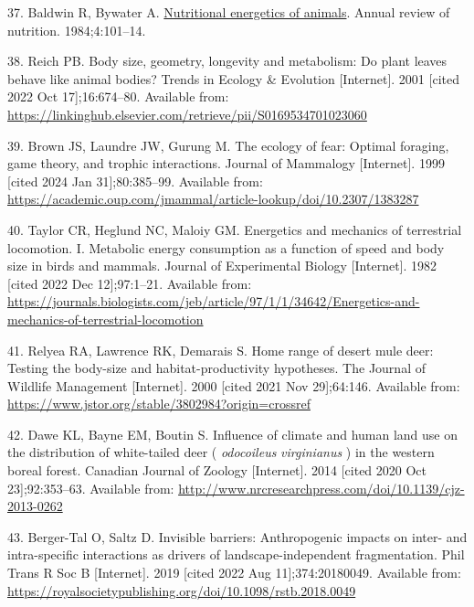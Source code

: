 \documentclass[
  12pt,
]{article}
\newlength{\cslhangindent}
\newenvironment{CSLReferences}[2] %
 {\begin{list}{}{%
  \setlength{\itemindent}{0pt}
  \setlength{\leftmargin}{0pt}
  \setlength{\parsep}{0pt}
  \ifodd #1
   \setlength{\leftmargin}{\cslhangindent}
   \setlength{\itemindent}{-1\cslhangindent}
  \fi
  \setlength{\itemsep}{#2\baselineskip}}}
 {\end{list}}
\begin{document}
\begin{CSLReferences}{0}{1}
37. Baldwin R, Bywater A. \href{https://doi.org/10.1146/annurev.nu.04.070184.000533}{Nutritional energetics of animals}. Annual review of nutrition. 1984;4:101--14.

38. Reich PB. Body size, geometry, longevity and metabolism: Do plant leaves behave like animal bodies? Trends in Ecology \& Evolution {[}Internet{]}. 2001 {[}cited 2022 Oct 17{]};16:674--80. Available from: \url{https://linkinghub.elsevier.com/retrieve/pii/S0169534701023060}

39. Brown JS, Laundre JW, Gurung M. The ecology of fear: Optimal foraging, game theory, and trophic interactions. Journal of Mammalogy {[}Internet{]}. 1999 {[}cited 2024 Jan 31{]};80:385--99. Available from: \url{https://academic.oup.com/jmammal/article-lookup/doi/10.2307/1383287}

40. Taylor CR, Heglund NC, Maloiy GM. Energetics and mechanics of terrestrial locomotion. I. Metabolic energy consumption as a function of speed and body size in birds and mammals. Journal of Experimental Biology {[}Internet{]}. 1982 {[}cited 2022 Dec 12{]};97:1--21. Available from: \url{https://journals.biologists.com/jeb/article/97/1/1/34642/Energetics-and-mechanics-of-terrestrial-locomotion}

41. Relyea RA, Lawrence RK, Demarais S. Home range of desert mule deer: Testing the body-size and habitat-productivity hypotheses. The Journal of Wildlife Management {[}Internet{]}. 2000 {[}cited 2021 Nov 29{]};64:146. Available from: \url{https://www.jstor.org/stable/3802984?origin=crossref}

42. Dawe KL, Bayne EM, Boutin S. Influence of climate and human land use on the distribution of white-tailed deer ( \emph{odocoileus} \emph{virginianus} ) in the western boreal forest. Canadian Journal of Zoology {[}Internet{]}. 2014 {[}cited 2020 Oct 23{]};92:353--63. Available from: \url{http://www.nrcresearchpress.com/doi/10.1139/cjz-2013-0262}

43. Berger-Tal O, Saltz D. Invisible barriers: Anthropogenic impacts on inter- and intra-specific interactions as drivers of landscape-independent fragmentation. Phil Trans R Soc B {[}Internet{]}. 2019 {[}cited 2022 Aug 11{]};374:20180049. Available from: \url{https://royalsocietypublishing.org/doi/10.1098/rstb.2018.0049}


\end{CSLReferences}
\end{document}
